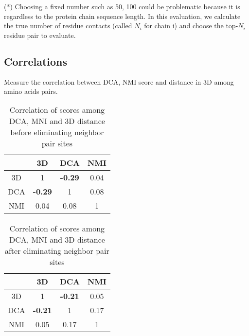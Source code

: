 \documentclass[a4paper,12pt]{article}
\begin{document}
(*) Choosing a fixed number such as 50, 100 could be problematic because it is regardless to the protein chain sequence length. In this evaluation, we calculate the true number of residue contacts (called $N_i$ for chain i) and choose the top-$N_i$ residue pair to evaluate.

\subsection*{Correlations}
Measure the correlation between DCA, NMI score and distance in 3D among amino acids pairs.

\begin{table}[htbp]
\begin{center}
\begin{tabular}{|c|c|c|c|} \hline
 & 3D & DCA & NMI \\\hline
 3D & 1 & \textbf{-0.29} & 0.04 \\\hline
 DCA & \textbf{-0.29} & 1 & 0.08 \\\hline
 NMI & 0.04 & 0.08 & 1 \\\hline
 \hline
\end{tabular}
\caption{Correlation of scores among DCA, MNI and 3D distance before eliminating neighbor pair sites}
\end{center}
\end{table}
\paragraph{}
\begin{table}[htbp]
\begin{center}
\begin{tabular}{|c|c|c|c|} \hline
 & 3D & DCA & NMI \\\hline
 3D & 1 & \textbf{-0.21} & 0.05 \\\hline
 DCA & \textbf{-0.21} & 1 & 0.17 \\\hline
 NMI & 0.05 & 0.17 & 1 \\\hline
 \hline
\end{tabular}
\caption{Correlation of scores among DCA, MNI and 3D distance after eliminating neighbor pair sites}
\end{center}
\end{table}
\end{document}
